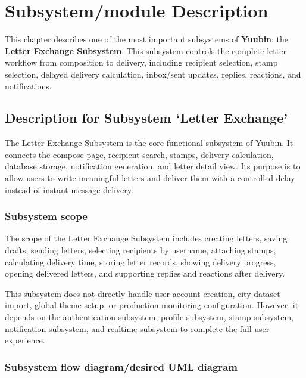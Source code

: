 ﻿\documentclass[12pt,a4paper]{report}
\begin{document}
\clearpage

\chapter{Subsystem/module Description}

This chapter describes one of the most important subsystems of \textbf{Yuubin}: the \textbf{Letter Exchange Subsystem}. This subsystem controls the complete letter workflow from composition to delivery, including recipient selection, stamp selection, delayed delivery calculation, inbox/sent updates, replies, reactions, and notifications.

\section{Description for Subsystem `Letter Exchange'}

The Letter Exchange Subsystem is the core functional subsystem of Yuubin. It connects the compose page, recipient search, stamps, delivery calculation, database storage, notification generation, and letter detail view. Its purpose is to allow users to write meaningful letters and deliver them with a controlled delay instead of instant message delivery.

\subsection{Subsystem scope}

The scope of the Letter Exchange Subsystem includes creating letters, saving drafts, sending letters, selecting recipients by username, attaching stamps, calculating delivery time, storing letter records, showing delivery progress, opening delivered letters, and supporting replies and reactions after delivery.

This subsystem does not directly handle user account creation, city dataset import, global theme setup, or production monitoring configuration. However, it depends on the authentication subsystem, profile subsystem, stamp subsystem, notification subsystem, and realtime subsystem to complete the full user experience.

\subsection{Subsystem flow diagram/desired UML diagram}
\end{document}
